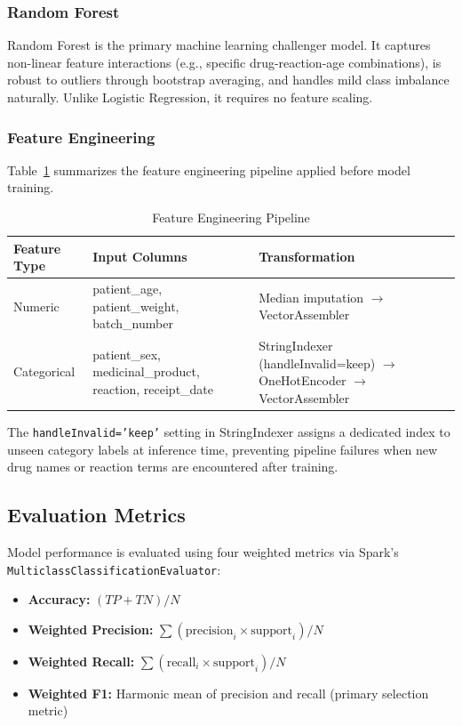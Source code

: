 \documentclass[conference]{IEEEtran}
\begin{document}
\subsubsection{Random Forest}
Random Forest is the primary machine learning challenger model. It captures non-linear feature interactions (e.g., specific drug-reaction-age combinations), is robust to outliers through bootstrap averaging, and handles mild class imbalance naturally. Unlike Logistic Regression, it requires no feature scaling.

\subsubsection{Feature Engineering}
Table~\ref{tab:features} summarizes the feature engineering pipeline applied before model training.

\begin{table}[htbp]
\caption{Feature Engineering Pipeline}
\label{tab:features}
\centering
\begin{tabular}{p{2.4cm}p{2.4cm}p{2.2cm}}
\toprule
\textbf{Feature Type} & \textbf{Input Columns} & \textbf{Transformation} \\
\midrule
Numeric    & patient\_age, patient\_weight, batch\_number & Median imputation $\rightarrow$ VectorAssembler \\
Categorical & patient\_sex, medicinal\_product, reaction, receipt\_date & StringIndexer (handleInvalid=keep) $\rightarrow$ OneHotEncoder $\rightarrow$ VectorAssembler \\
\bottomrule
\end{tabular}
\end{table}

The \texttt{handleInvalid='keep'} setting in StringIndexer assigns a dedicated index to unseen category labels at inference time, preventing pipeline failures when new drug names or reaction terms are encountered after training.

\subsection{Evaluation Metrics}

Model performance is evaluated using four weighted metrics via Spark's \texttt{MulticlassClassificationEvaluator}:
\begin{itemize}
    \item \textbf{Accuracy:} $(TP + TN) / N$
    \item \textbf{Weighted Precision:} $\sum(\text{precision}_i \times \text{support}_i) / N$
    \item \textbf{Weighted Recall:} $\sum(\text{recall}_i \times \text{support}_i) / N$
    \item \textbf{Weighted F1:} Harmonic mean of precision and recall (primary selection metric)
\end{itemize}
\end{document}
